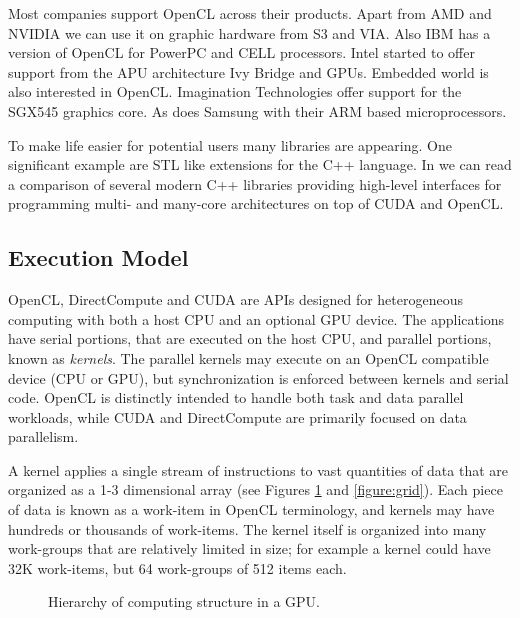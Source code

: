 \documentclass{comjnl}
\begin{document}
Most companies support OpenCL across their products. Apart from AMD and NVIDIA we can use it on graphic hardware from S3 and VIA. Also IBM has a version of OpenCL for PowerPC and CELL processors. Intel started to offer support from the APU architecture Ivy Bridge and GPUs. Embedded world is also interested in OpenCL. Imagination Technologies offer support for the SGX545 graphics core. As does Samsung with their ARM based microprocessors.

To make life easier for potential users many libraries are appearing. One significant example are STL like extensions for the C++ language. In \cite{doi:10.1137/120903683} we can read a comparison of several modern C++ libraries providing high-level interfaces for programming multi- and many-core architectures on top of CUDA and OpenCL.

\subsection{Execution Model}

OpenCL, DirectCompute and CUDA are APIs designed for heterogeneous computing with both a host CPU and an optional GPU device. The applications have serial portions, that are executed on the host CPU, and parallel portions, known as \textit{kernels}. The parallel kernels may execute on an OpenCL compatible device (CPU or GPU), but synchronization is enforced between kernels and serial code. OpenCL is distinctly intended to handle both task and data parallel workloads, while CUDA and DirectCompute are primarily focused on data parallelism. 

A kernel applies a single stream of instructions to vast quantities of data that are organized as a 1-3 dimensional array (see Figures \ref{figure:captura1paperCEC} and \ref{figure:grid}). Each piece of data is known as a work-item in OpenCL terminology, and kernels may have hundreds or thousands of work-items. The kernel itself is organized into many work-groups that are relatively limited in size; for example a kernel could have 32K work-items, but 64 work-groups of 512 items each. 

\begin{figure}[h]
\centerline{}
\caption{Hierarchy of computing structure in a GPU.}
\label{figure:captura1paperCEC}
\end{figure}
\end{document}
